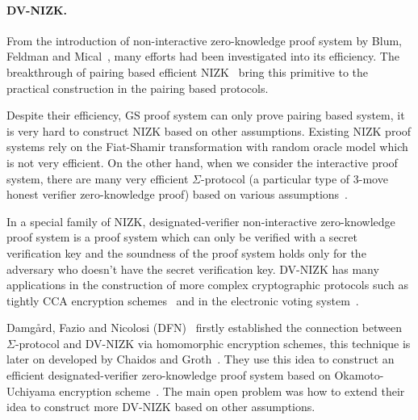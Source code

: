 \paragraph{DV-NIZK.}
From the introduction of non-interactive zero-knowledge proof system by Blum, Feldman and Mical~\cite{DBLP:conf/stoc/BlumFM88},
many efforts had been investigated into its efficiency.
The breakthrough of pairing based efficient NIZK~\cite{DBLP:conf/eurocrypt/GrothS08} bring this primitive to the practical construction in the pairing based protocols.

Despite their efficiency, GS proof system can only prove pairing based system, it is very hard to construct NIZK based on other assumptions.
Existing NIZK proof systems rely on the Fiat-Shamir transformation with random oracle model which is not very efficient.
On the other hand, when we consider the interactive proof system,
there are many very efficient $\Sigma$-protocol (a particular type of 3-move honest verifier zero-knowledge proof) based on various assumptions~\cite{DBLP:journals/iacr/BaumDOP16}\cite{DBLP:conf/crypto/BaumDLN16}.

In a special family of NIZK, designated-verifier non-interactive zero-knowledge proof system is a proof system which can only be verified with a secret verification key
and the soundness of the proof system holds only for the adversary who doesn't have the secret verification key.
DV-NIZK has many applications in the construction of more complex cryptographic protocols such as
tightly CCA encryption schemes~\cite{DBLP:conf/eurocrypt/GayHKW16} and in the electronic voting system~\cite{DBLP:conf/pkc/ChaidosG15}.


Damg\r{a}rd, Fazio and Nicolosi (DFN)~\cite{DBLP:conf/tcc/DamgardFN06} firstly established the connection between $\Sigma$-protocol and DV-NIZK via homomorphic encryption schemes,
this technique is later on developed by Chaidos and Groth~\cite{DBLP:conf/pkc/ChaidosG15}.
They use this idea to construct an efficient designated-verifier zero-knowledge proof system based on Okamoto-Uchiyama encryption scheme~\cite{DBLP:conf/eurocrypt/OkamotoU98}.
The main open problem was how to extend their idea to construct more DV-NIZK based on other assumptions.
